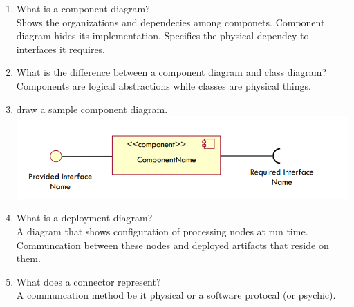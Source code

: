 \documentclass[10pt]{article}
\begin{document}
\begin{enumerate}
      \item What is a component diagram?\\
            Shows the organizations and dependecies among componets. Component diagram hides its implementation. Specifies the physical dependcy to interfaces it requires.\\

      \item What is the difference between a component diagram and class diagram?\\
            Components are logical abstractions while classes are physical things. \\

      \item draw a sample component diagram.\\
            \includegraphics*[scale=.5]{samplecomp.png}


      \item What is a deployment diagram?\\
            A diagram that shows configuration of processing nodes at run time. Communcation between these nodes and deployed artifacts that reside on them.\\

      \item What does a connector represent?\\
            A communcation method be it physical or a software protocal (or psychic).
            \\

\end{enumerate}
\end{document}
